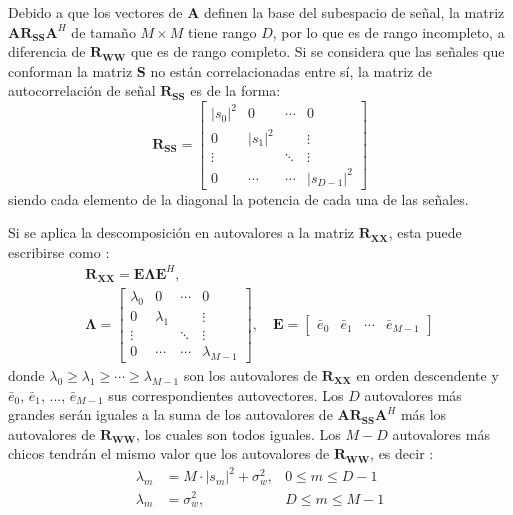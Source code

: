 Debido a que los vectores de $\mathbf{A}$ definen la base del subespacio de señal, la matriz $\mathbf{AR_{SS}A}^H$ de tamaño $M\times M$ tiene rango $D$, por lo que es de rango incompleto, a diferencia de $\mathbf{R_{WW}}$ que es de rango completo. Si se considera que las señales que conforman la matriz $\mathbf{S}$ no están correlacionadas entre sí, la matriz de autocorrelación de señal $\mathbf{R_{SS}}$ es de la forma:
\begin{equation}
    \mathbf{R_{SS}}=
    \begin{bmatrix}
        |s_0|^2 & 0       & \cdots & 0           \\
        0       & |s_1|^2 &        & \vdots      \\
        \vdots  &         & \ddots & \vdots      \\
        0       & \cdots  & \cdots & |s_{D-1}|^2
    \end{bmatrix}
    \label{eq:doaest_rss}
\end{equation}
siendo cada elemento de la diagonal la potencia de cada una de las señales.

Si se aplica la descomposición en autovalores a la matriz $\mathbf{R_{XX}}$, esta puede escribirse como \cite{bib:Manolakis_ch9.6}:
\begin{gather}
    \mathbf{R_{XX}}= \mathbf{E\Lambda E}^H,    \label{eq:doaest_eigendesc}\\
    \mathbf{\Lambda}=    \begin{bmatrix}
        \lambda_0 & 0         & \cdots & 0             \\
        0         & \lambda_1 &        & \vdots        \\
        \vdots    &           & \ddots & \vdots        \\
        0         & \cdots    & \cdots & \lambda_{M-1}
    \end{bmatrix},\quad
    \mathbf{E}=\begin{bmatrix}
        \bar{e}_0 & \bar{e}_1 & \cdots & \bar{e}_{M-1}
    \end{bmatrix}\nonumber
\end{gather}
donde $\lambda_0\geq \lambda_1 \geq \cdots \geq \lambda_{M-1}$ son los autovalores de $\mathbf{R_{XX}}$ en orden descendente y $\bar{e}_0$, $\bar{e}_1$, ..., $\bar{e}_{M-1}$ sus correspondientes autovectores. Los $D$ autovalores más grandes serán iguales a la suma de los autovalores de $\mathbf{AR_{SS}A}^H$ más los autovalores de $\mathbf{R_{WW}}$, los cuales son todos iguales. Los $M-D$ autovalores más chicos tendrán el mismo valor que los autovalores de $\mathbf{R_{WW}}$, es decir \cite{bib:Manolakis_ch9.6}:
\begin{equation}
    \begin{aligned}
        \lambda_m & = M \cdot |s_m|^2+\sigma_w^2, & 0\leq m\leq D-1 \\
        \lambda_m & = \sigma_w^2,                 & D\leq m\leq M-1
    \end{aligned}
    \label{eq:doaest_aval}
\end{equation}

